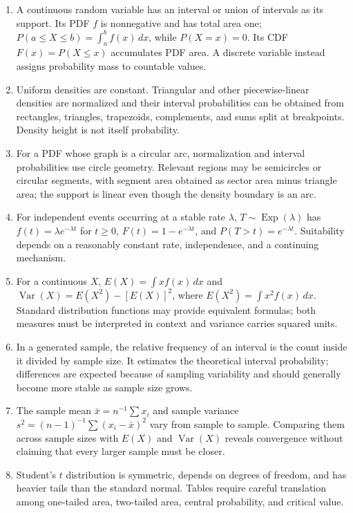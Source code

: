 \documentclass[10pt,letterpaper]{article}
\newcommand{\plansection}[1]{\Needspace{8\baselineskip}\par\vspace{8pt}{\large\bfseries #1\par}\vspace{3pt}}
\begin{document}
	\plansection{3. Conceptual standards of the disciplinary knowledge that supports the narrative's development}
	\begin{enumerate}[label=\textbf{\arabic*.}]
		\item A continuous random variable has an interval or union of intervals as its support. Its PDF $f$ is nonnegative and has total area one; $P(a\le X\le b)=\int_a^b f(x)\,dx$, while $P(X=x)=0$. Its CDF $F(x)=P(X\le x)$ accumulates PDF area. A discrete variable instead assigns probability mass to countable values.
		\item Uniform densities are constant. Triangular and other piecewise-linear densities are normalized and their interval probabilities can be obtained from rectangles, triangles, trapezoids, complements, and sums split at breakpoints. Density height is not itself probability.
		\item For a PDF whose graph is a circular arc, normalization and interval probabilities use circle geometry. Relevant regions may be semicircles or circular segments, with segment area obtained as sector area minus triangle area; the support is linear even though the density boundary is an arc.
		\item For independent events occurring at a stable rate $\lambda$, $T\sim\operatorname{Exp}(\lambda)$ has $f(t)=\lambda e^{-\lambda t}$ for $t\ge0$, $F(t)=1-e^{-\lambda t}$, and $P(T>t)=e^{-\lambda t}$. Suitability depends on a reasonably constant rate, independence, and a continuing mechanism.
		\item For a continuous $X$, $E(X)=\int xf(x)\,dx$ and $\operatorname{Var}(X)=E(X^2)-[E(X)]^2$, where $E(X^2)=\int x^2f(x)\,dx$. Standard distribution functions may provide equivalent formulas; both measures must be interpreted in context and variance carries squared units.
		\item In a generated sample, the relative frequency of an interval is the count inside it divided by sample size. It estimates the theoretical interval probability; differences are expected because of sampling variability and should generally become more stable as sample size grows.
		\item The sample mean $\bar x=n^{-1}\sum x_i$ and sample variance $s^2=(n-1)^{-1}\sum(x_i-\bar x)^2$ vary from sample to sample. Comparing them across sample sizes with $E(X)$ and $\operatorname{Var}(X)$ reveals convergence without claiming that every larger sample must be closer.
		\item Student's $t$ distribution is symmetric, depends on degrees of freedom, and has heavier tails than the standard normal. Tables require careful translation among one-tailed area, two-tailed area, central probability, and critical value.

\end{enumerate}
\end{document}

